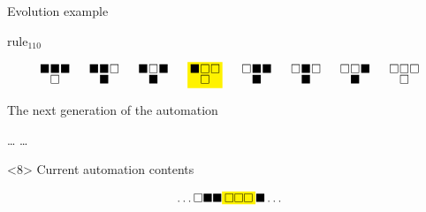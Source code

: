\documentclass[presentation,aspectratio=169,smaller]{beamer}
\begin{document}
\begin{frame}[label={sec:org3545853},t]{Evolution example}
\begin{onlyenv}
\(\text{rule}_{110}\)

\begin{equation*}
  \begingroup
  \setlength\arraycolsep{0.25pt}
  \renewcommand{\arraystretch}{0.5}
  \begin{matrix}
    \blacksquare & \blacksquare & \blacksquare \\
    & \square &
  \end{matrix}\mspace{28mu}
  \begin{matrix}
    \blacksquare & \blacksquare & \square \\
    & \blacksquare &
  \end{matrix}\mspace{28mu}
  \begin{matrix}
    \blacksquare & \square & \blacksquare \\
    & \blacksquare &
  \end{matrix}\mspace{28mu}
  \mathcolorbox{yellow}{
    \begin{matrix}
      \blacksquare & \square & \square \\
      & \square &
    \end{matrix}
  }\mspace{28mu}
  \begin{matrix}
    \square & \blacksquare & \blacksquare \\
    & \blacksquare &
  \end{matrix}\mspace{28mu}
  \begin{matrix}
    \square & \blacksquare & \square \\
    & \blacksquare &
  \end{matrix}\mspace{28mu}
  \begin{matrix}
    \square & \square & \blacksquare \\
    & \blacksquare &
  \end{matrix}\mspace{28mu}
  \begin{matrix}
    \square & \square & \square \\
    & \square &
  \end{matrix}
  \endgroup
\end{equation*}

The next generation of the automation

\hfill \dots
\blacksquare
\blacksquare
\blacksquare
{}
\mspace{14mu}
\mspace{14mu}
\mspace{14mu}
\dots \hfill
\end{onlyenv}

\begin{onlyenv}<8>
Current automation contents

\begin{equation*}
  \hfill
  \dots
  \square
  \blacksquare
  \blacksquare
  \mathcolorbox{yellow}{
    \square
    \square
    \square
  }
  \blacksquare
  \dots
  \hfill
\end{equation*}


\end{onlyenv}
\end{frame}
\end{document}
